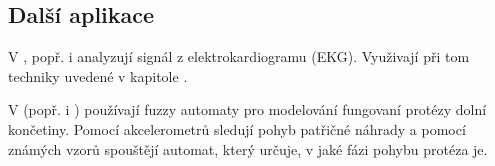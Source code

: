 \documentclass[a4paper,10pt]{article}
\begin{document}
\subsection{Další aplikace}
V \cite{PedGac-LeaFuzzAut}, popř. i \cite{RigTza-FuzAutFauDia} analyzují signál z elektrokardiogramu (EKG). Využivají při tom techniky uvedené v kapitole .

V \cite{Alv-HumGaiModUsGenFuzFinStaMac} (popř. i \cite{AlvTri-ComModQuaPerSig} )
používají fuzzy automaty pro modelování fungovaní protézy dolní končetiny. Pomocí akcelerometrů sledují pohyb patřičné náhrady a pomocí známých vzorů spouštějí automat, který určuje, v jaké fázi pohybu protéza je.

% 

% 
\end{document}
